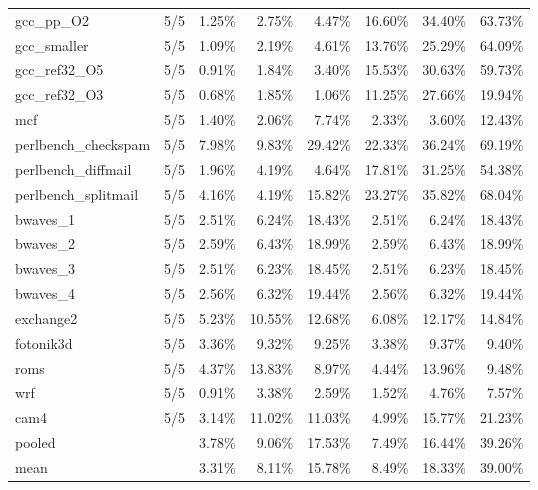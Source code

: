 \documentclass[10pt,a4paper,landscape]{article}
\begin{document}
{\begin{longtable}{lcrrrrrr}
gcc\_pp\_O2 & 5/5 & 1.25\% & 2.75\% & 4.47\% & 16.60\% & 34.40\% & 63.73\% \\
gcc\_smaller & 5/5 & 1.09\% & 2.19\% & 4.61\% & 13.76\% & 25.29\% & 64.09\% \\
gcc\_ref32\_O5 & 5/5 & 0.91\% & 1.84\% & 3.40\% & 15.53\% & 30.63\% & 59.73\% \\
gcc\_ref32\_O3 & 5/5 & 0.68\% & 1.85\% & 1.06\% & 11.25\% & 27.66\% & 19.94\% \\
mcf & 5/5 & 1.40\% & 2.06\% & 7.74\% & 2.33\% & 3.60\% & 12.43\% \\
perlbench\_checkspam & 5/5 & 7.98\% & 9.83\% & 29.42\% & 22.33\% & 36.24\% & 69.19\% \\
perlbench\_diffmail & 5/5 & 1.96\% & 4.19\% & 4.64\% & 17.81\% & 31.25\% & 54.38\% \\
perlbench\_splitmail & 5/5 & 4.16\% & 4.19\% & 15.82\% & 23.27\% & 35.82\% & 68.04\% \\
bwaves\_1 & 5/5 & 2.51\% & 6.24\% & 18.43\% & 2.51\% & 6.24\% & 18.43\% \\
bwaves\_2 & 5/5 & 2.59\% & 6.43\% & 18.99\% & 2.59\% & 6.43\% & 18.99\% \\
bwaves\_3 & 5/5 & 2.51\% & 6.23\% & 18.45\% & 2.51\% & 6.23\% & 18.45\% \\
bwaves\_4 & 5/5 & 2.56\% & 6.32\% & 19.44\% & 2.56\% & 6.32\% & 19.44\% \\
exchange2 & 5/5 & 5.23\% & 10.55\% & 12.68\% & 6.08\% & 12.17\% & 14.84\% \\
fotonik3d & 5/5 & 3.36\% & 9.32\% & 9.25\% & 3.38\% & 9.37\% & 9.40\% \\
roms & 5/5 & 4.37\% & 13.83\% & 8.97\% & 4.44\% & 13.96\% & 9.48\% \\
wrf & 5/5 & 0.91\% & 3.38\% & 2.59\% & 1.52\% & 4.76\% & 7.57\% \\
cam4 & 5/5 & 3.14\% & 11.02\% & 11.03\% & 4.99\% & 15.77\% & 21.23\% \\
\midrule
pooled &  & 3.78\% & 9.06\% & 17.53\% & 7.49\% & 16.44\% & 39.26\% \\
mean &  & 3.31\% & 8.11\% & 15.78\% & 8.49\% & 18.33\% & 39.00\% \\
\end{longtable}
}
\clearpage
\end{document}
